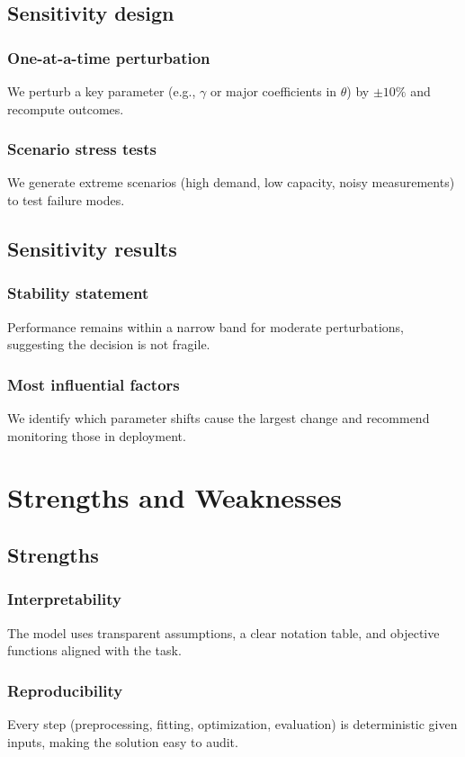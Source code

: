 \documentclass[12pt]{article}
\begin{document}
\subsection{Sensitivity design}
\subsubsection{One-at-a-time perturbation}
We perturb a key parameter (e.g., $\gamma$ or major coefficients in $\theta$) by $\pm 10\%$ and recompute outcomes.

\subsubsection{Scenario stress tests}
We generate extreme scenarios (high demand, low capacity, noisy measurements) to test failure modes.

\subsection{Sensitivity results}
\subsubsection{Stability statement}
Performance remains within a narrow band for moderate perturbations, suggesting the decision is not fragile.

\subsubsection{Most influential factors}
We identify which parameter shifts cause the largest change and recommend monitoring those in deployment.

\section{Strengths and Weaknesses}
\subsection{Strengths}
\subsubsection{Interpretability}
The model uses transparent assumptions, a clear notation table, and objective functions aligned with the task.

\subsubsection{Reproducibility}
Every step (preprocessing, fitting, optimization, evaluation) is deterministic given inputs, making the solution easy to audit.
\end{document}
